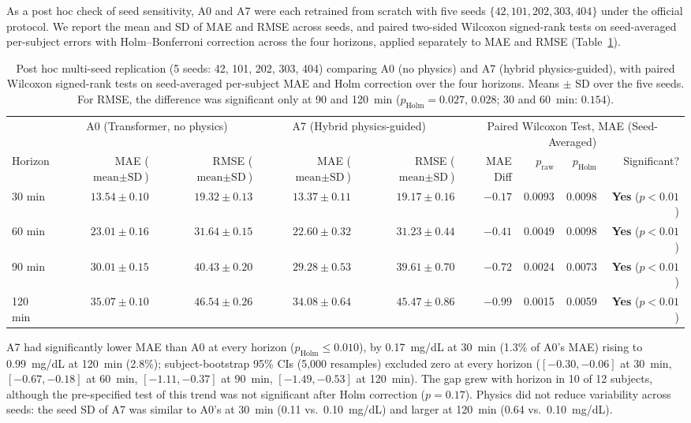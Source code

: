 \documentclass[journal]{IEEEtran}
\begin{document}
As a post hoc check of seed sensitivity, A0 and A7 were each retrained from scratch with five seeds $\{42, 101, 202, 303, 404\}$ under the official protocol. We report the mean and SD of MAE and RMSE across seeds, and paired two-sided Wilcoxon signed-rank tests on seed-averaged per-subject errors with Holm--Bonferroni correction across the four horizons, applied separately to MAE and RMSE (Table~\ref{tab:multiseed}).

\begin{table}[t]
\centering
\caption{Post hoc multi-seed replication (5 seeds: 42, 101, 202, 303, 404) comparing A0 (no physics) and A7 (hybrid physics-guided), with paired Wilcoxon signed-rank tests on seed-averaged per-subject MAE and Holm correction over the four horizons. Means $\pm$ SD over the five seeds. For RMSE, the difference was significant only at 90 and 120~min ($p_{\text{Holm}} = 0.027$, $0.028$; 30 and 60~min: $0.154$).}
\label{tab:multiseed}
\footnotesize
\setlength{\tabcolsep}{4.5pt}
\begin{tabular}{lrrrrrrrr}
\toprule
& \multicolumn{2}{c}{A0 (Transformer, no physics)} & \multicolumn{2}{c}{A7 (Hybrid physics-guided)} & \multicolumn{4}{c}{Paired Wilcoxon Test, MAE (Seed-Averaged)} \\
\cmidrule(lr){2-3} \cmidrule(lr){4-5} \cmidrule(lr){6-9}
Horizon & MAE ($\text{mean}\pm\text{SD}$) & RMSE ($\text{mean}\pm\text{SD}$) & MAE ($\text{mean}\pm\text{SD}$) & RMSE ($\text{mean}\pm\text{SD}$) & MAE Diff & $p_{\text{raw}}$ & $p_{\text{Holm}}$ & Significant? \\
\midrule
30 min & $13.54 \pm 0.10$ & $19.32 \pm 0.13$ & $\mathbf{13.37 \pm 0.11}$ & $\mathbf{19.17 \pm 0.16}$ & $-0.17$ & 0.0093 & 0.0098 & \textbf{Yes} ($p < 0.01$) \\
60 min & $23.01 \pm 0.16$ & $31.64 \pm 0.15$ & $\mathbf{22.60 \pm 0.32}$ & $\mathbf{31.23 \pm 0.44}$ & $-0.41$ & 0.0049 & 0.0098 & \textbf{Yes} ($p < 0.01$) \\
90 min & $30.01 \pm 0.15$ & $40.43 \pm 0.20$ & $\mathbf{29.28 \pm 0.53}$ & $\mathbf{39.61 \pm 0.70}$ & $-0.72$ & 0.0024 & 0.0073 & \textbf{Yes} ($p < 0.01$) \\
120 min & $35.07 \pm 0.10$ & $46.54 \pm 0.26$ & $\mathbf{34.08 \pm 0.64}$ & $\mathbf{45.47 \pm 0.86}$ & $-0.99$ & 0.0015 & 0.0059 & \textbf{Yes} ($p < 0.01$) \\
\bottomrule
\end{tabular}
\end{table}

A7 had significantly lower MAE than A0 at every horizon ($p_{\text{Holm}} \le 0.010$), by 0.17~mg/dL at 30~min (1.3\% of A0's MAE) rising to 0.99~mg/dL at 120~min (2.8\%); subject-bootstrap 95\% CIs (5,000 resamples) excluded zero at every horizon ($[-0.30, -0.06]$ at 30~min, $[-0.67, -0.18]$ at 60~min, $[-1.11, -0.37]$ at 90~min, $[-1.49, -0.53]$ at 120~min). The gap grew with horizon in 10 of 12 subjects, although the pre-specified test of this trend was not significant after Holm correction ($p = 0.17$). Physics did not reduce variability across seeds: the seed SD of A7 was similar to A0's at 30~min (0.11 vs.\ 0.10~mg/dL) and larger at 120~min (0.64 vs.\ 0.10~mg/dL).
\end{document}
